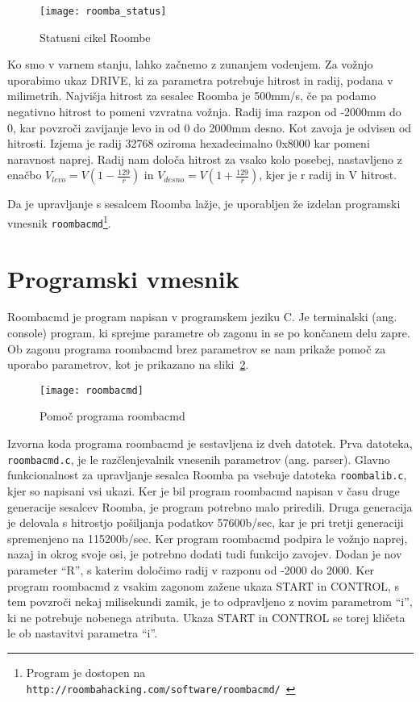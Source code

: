 \documentclass[a4paper, 12pt]{book}
\begin{document}
\begin{figure}[h]
	\centering
	\texttt{[image: roomba\_status]}
	\caption{Statusni cikel Roombe~\cite{bibHackRoomba}}
	\label{picRoombaStatus}
\end{figure}

Ko smo v varnem stanju, lahko začnemo z zunanjem vodenjem. Za vožnjo uporabimo ukaz DRIVE, ki za parametra potrebuje hitrost in radij, podana v milimetrih. Najvišja hitrost za sesalec Roomba je 500mm/s, če pa podamo negativno hitrost to pomeni vzvratna vožnja. Radij ima razpon od -2000mm do 0, kar povzroči zavijanje levo in od 0 do 2000mm desno. Kot zavoja je odvisen od hitrosti. Izjema je radij 32768 oziroma hexadecimalno 0x8000 kar pomeni naravnost naprej. Radij nam določa hitrost za vsako kolo posebej, nastavljeno z enačbo $V_{levo} = V(1-\frac{129}{r})$ in $V_{desno} = V(1+\frac{129}{r})$, kjer je r radij in V hitrost. 

Da je upravljanje s sesalcem Roomba lažje, je uporabljen že izdelan programski vmesnik {\tt roombacmd}\footnote{Program je dostopen na {\tt http://roombahacking.com/software/roombacmd/}~\cite{bibRoombacmd}}.

\section{Programski vmesnik}
Roombacmd je program napisan v programskem jeziku C. Je terminalski (ang. console) program, ki sprejme parametre ob zagonu in se po končanem delu zapre. Ob zagonu programa roombacmd brez parametrov se nam prikaže pomoč za uporabo parametrov, kot je prikazano na sliki~\ref{picRoombacmd}. 

\begin{figure}[h]
	\centering
	\texttt{[image: roombacmd]}
	\caption{Pomoč programa roombacmd}
	\label{picRoombacmd}
\end{figure}

Izvorna koda programa roombacmd je sestavljena iz dveh datotek. Prva datoteka, {\tt roombacmd.c}, je le razčlenjevalnik vnesenih parametrov (ang. par\-ser). Glavno funkcionalnost za upravljanje sesalca Roomba pa vsebuje datoteka {\tt roombalib.c}, kjer so napisani vsi ukazi. Ker je bil program roombacmd napisan v času druge generacije sesalcev Roomba, je program potrebno malo priredili. Druga generacija je delovala s hitrostjo pošiljanja podatkov 57600b/sec, kar je pri tretji generaciji spremenjeno na 115200b/sec. Ker program roombacmd podpira le vožnjo naprej, nazaj in okrog svoje osi, je potrebno dodati tudi funkcijo zavojev. Dodan je nov parameter ``R'', s katerim določimo radij v razponu od -2000 do 2000. Ker program roombacmd z vsakim zagonom zažene ukaza START in CONTROL, s tem povzroči nekaj milisekundi zamik, je to odpravljeno z novim parametrom ``i'', ki ne potrebuje nobenega atributa. Ukaza START in CONTROL se torej kličeta le ob nastavitvi parametra ``i''.
\end{document}
